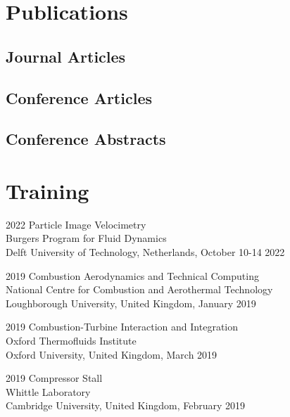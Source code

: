 \documentclass[12pt,letterpaper]{report}
\begin{document}
    \section*{Publications}
    
    \subsection*{Journal Articles}
        \nocite{*}
        \printbibliography[type=article,heading=none,resetnumbers, notkeyword=abstract,nottype=url,nottype=doi]

    \subsection*{Conference Articles}
        \nocite{*}
        \printbibliography[type=inproceedings, heading=none, resetnumbers, notkeyword=abstract,nottype=url,nottype=doi]

     \subsection*{Conference Abstracts}
        \nocite{*}
        \printbibliography[heading=none, resetnumbers, keyword=abstract,nottype=url,nottype=doi]
    
    
       	
    \section*{Training}
    
	\begin{tablist}
	
	\item[2022] \tab{}Particle Image Velocimetry \\ 
	Burgers Program for Fluid Dynamics \\
	Delft University of Technology, Netherlands, October 10-14 2022 
	
	\item[2019] \tab{}Combustion Aerodynamics and Technical Computing \\
	National Centre for Combustion and Aerothermal Technology \\
	Loughborough University, United Kingdom, January 2019
	
	\item[2019] \tab{}Combustion-Turbine Interaction and Integration \\ 
	Oxford Thermofluids Institute \\
	Oxford University, United Kingdom, March 2019
	
	\item[2019] \tab{}Compressor Stall \\ 
	Whittle Laboratory \\
	Cambridge University, United Kingdom, February 2019
	
	
	\end{tablist}
\end{document}
